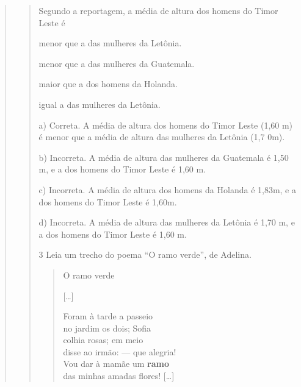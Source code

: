 \begin{escolha}
\begin{escolha}
\begin{quote}
\begin{quote}

Segundo a reportagem, a média de altura dos homens do Timor Leste é

\begin{escolha}
\item menor que a das mulheres da Letônia.

\item menor que a das mulheres da Guatemala.

\item maior que a dos homens da Holanda.

\item igual a das mulheres da Letônia.
\end{escolha}


a)  Correta. A média de altura dos homens do Timor Leste (1,60 m) é
menor que a média de altura das mulheres da Letônia (1,7 0m).

b)  Incorreta. A média de altura das mulheres da Guatemala é 1,50 m, e a
dos homens do Timor Leste é 1,60 m.

c)  Incorreta. A média de altura dos homens da Holanda é 1,83m, e a dos
homens do Timor Leste é 1,60m.

d)  Incorreta. A média de altura das mulheres da Letônia é 1,70 m, e a
dos homens do Timor Leste é 1,60 m.

\num{3} Leia um trecho do poema ``O ramo verde'', de Adelina.

\begin{verse}
O ramo verde

{[}\ldots{}{]}

Foram à tarde a passeio\\
no jardim os dois; Sofia\\
colhia rosas; em meio\\
disse ao irmão: --- que alegria!\\
Vou dar à mamãe um \textbf{ramo}\\
das minhas amadas flores! {[}\ldots{}{]}
\end{verse}



\end{quote}
\end{quote}
\end{escolha}
\end{escolha}
